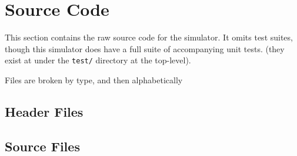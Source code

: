 \documentclass{article}
\begin{document}
\section{Source Code}

This section contains the raw source code for the simulator. It omits test
suites, though this simulator does have a full suite of accompanying unit tests.
(they exist at under the \texttt{test/} directory at the top-level).

Files are broken by type, and then alphabetically

\subsection{Header Files}


\clearpage

\clearpage

\clearpage

\clearpage

\clearpage

\clearpage

\clearpage

\clearpage

\clearpage

\clearpage

\clearpage

\subsection{Source Files}
\end{document}
